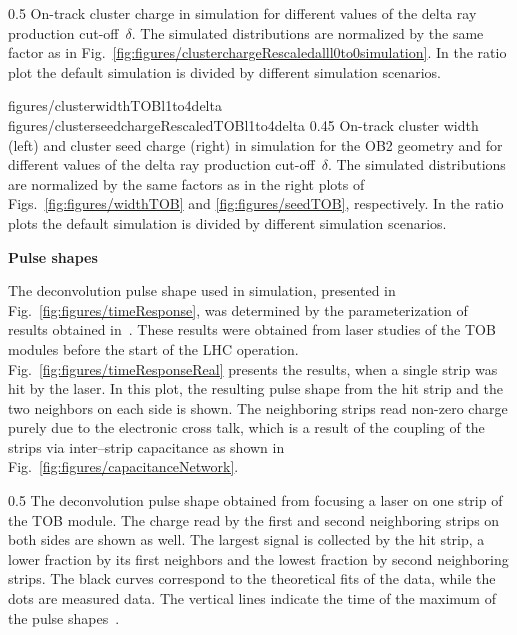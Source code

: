                  {0.5}       %
                 {  On-track cluster charge in simulation for different values of the delta ray production cut-off~$\delta$. The simulated distributions are normalized by the same factor as in Fig.~\ref{fig:figures/clusterchargeRescaledalll0to0simulation}. In the ratio plot the default simulation is divided by different simulation scenarios. }

                 {figures/clusterwidthTOBl1to4delta}
                 {figures/clusterseedchargeRescaledTOBl1to4delta} %
                 {0.45}       %
                 {  On-track cluster width (left) and cluster seed charge (right) in simulation for the OB2 geometry and for different values of the delta ray production cut-off~$\delta$.   The simulated distributions are normalized by the same factors as in the right plots of Figs.~\ref{fig:figures/widthTOB} and \ref{fig:figures/seedTOB}, respectively.  In the ratio plots the default simulation is divided by different simulation scenarios. }

\textbf{Pulse shapes}

The deconvolution pulse shape used in simulation, presented in Fig.~\ref{fig:figures/timeResponse}, was determined by the parameterization of results obtained in~\cite{Delaere:1061284}. These results were obtained from laser studies of the TOB modules before the start of the LHC operation. Fig.~\ref{fig:figures/timeResponseReal} presents the results, when a single strip was hit by the laser. In this plot, the resulting pulse shape from the hit strip and the two neighbors on each side is shown. The neighboring strips read non-zero charge purely due to the electronic cross talk, which is a result of the coupling of the strips via inter--strip capacitance as shown in Fig.~\ref{fig:figures/capacitanceNetwork}. 



                 {0.5}       %
                 { The deconvolution pulse shape obtained from focusing a laser on one strip of the TOB module. The charge read by the first and second neighboring strips on both sides are shown as well. The largest signal is collected by the hit strip, a lower fraction by its first neighbors and the lowest fraction by second neighboring strips. The black curves correspond to the theoretical fits of the data, while the dots are measured data. The vertical lines indicate the time of the maximum of the pulse shapes~\cite{Delaere:1061284}.  }

